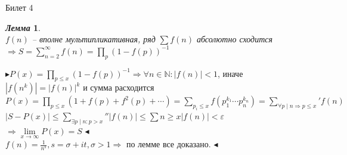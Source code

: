 \documentclass[a4paper,12pt]{article}
\newtheorem{lem}{\textit{Лемма}}
\newcommand{\q}{\quad}
\newcommand{\pb}{\blacktriangleright}
\newcommand{\pe}{\blacktriangleleft}
\newcommand{\Ra}{\Rightarrow}
\newcommand{\bb}[1]{\mathbb{#1}}
\newcommand{\SL}{\sum\limits}
\begin{document}
\newpage
\begin{mybox2}{{Билет 4}}
\begin{formbox}{}
\begin{lem}\q\\
$f(n)$ -- вполне мультипликативная, ряд $\sum f(n)$ абсолютно сходится $\Ra S = \SL_{n=2}^\infty f(n) = \prod\limits_p (1-f(p))^{-1}  $
\end{lem}
\end{formbox}
$\pb P(x) = \prod\limits_{p\le x} (1-f(p))^{-1}  \Ra \forall n\in\bb{N}: |f(n)| < 1$, иначе $|f(n^k)| = |f(n)|^k$ и сумма расходится\\
$P(x) = \prod\limits_{p\le x} (1 + f(p) + f^2(p) + \cdots) = \SL_{p_i\le x} f(p_1^{k_1}\cdots p_n^{k_n}) = \SL_{\forall p\mid n\Ra p \le x}' f(n)$\\
$|S-P(x)| \le \SL_{\exists p\mid n:p>x}''|f(n)|\le\SL{n \ge x}|f(n)| < \varepsilon$\\
$\Ra\lim\limits_{x\to\infty}P(x) = S$
$\pe$\\
$f(n) = \frac{1}{n^s}, s = \sigma + it, \sigma > 1\Ra$ по лемме все доказано. $\pe$

\end{mybox2}
\end{document}
